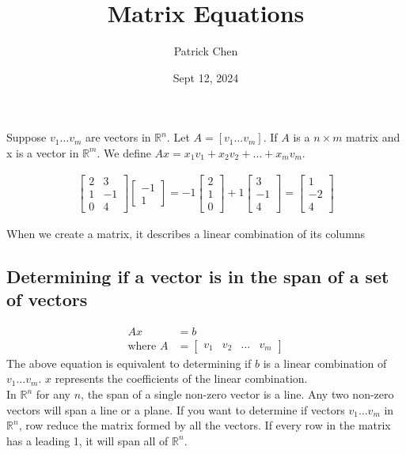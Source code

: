 \documentclass{article}
\title{Matrix Equations}
\author{Patrick Chen}
\date{Sept 12, 2024}
\theoremstyle{mytheoremstyle}
\theoremstyle{mytheoremstyle}
\theoremstyle{myproblemstyle}
\begin{document}
    \maketitle
    Suppose $v_1\dots v_m$ are vectors in $\mathbb{R}^n$. Let $A=[v_1\dots
    v_m]$. If $A$ is a $n\times m$ matrix and x is a vector in $\mathbb{R}^m$. We define
    $Ax = x_1v_1 + x_2v_2 + \dots + x_mv_m$.

    \begin{align*}
        \begin{bmatrix}
            2 & 3 \\ 1 & -1 \\ 0 & 4
        \end{bmatrix}
        \begin{bmatrix}
            -1 \\ 1
        \end{bmatrix} =
        -1\begin{bmatrix}
            2 \\ 1 \\ 0
        \end{bmatrix} +
        1\begin{bmatrix}
            3 \\ -1 \\ 4
        \end{bmatrix} =
        \begin{bmatrix}
            1 \\ -2 \\ 4
        \end{bmatrix}
    \end{align*}

    When we create a matrix, it describes a linear combination of its columns

    \subsection*{Determining if a vector is in the span of a set of vectors}
    \begin{align*}
        Ax &= b \\
        \text{where } A &= \begin{bmatrix}
            v_1 & v_2 & \dots & v_m
        \end{bmatrix}
    \end{align*}
    The above equation is equivalent to determining if $b$ is a linear
    combination of $v_1\dots v_m$. $x$ represents the coefficients of the linear
    combination. \\
    In $\mathbb{R}^n$ for any $n$, the span of a single non-zero vector is a
    line. Any two non-zero vectors will span a line or a plane. If you want to
    determine if vectors $v_1\dots v_m$ in $\mathbb{R}^n$, row reduce the matrix
    formed by all the vectors. If every row in the matrix has a leading 1, it
    will span all of $\mathbb{R}^n$.
\end{document}
